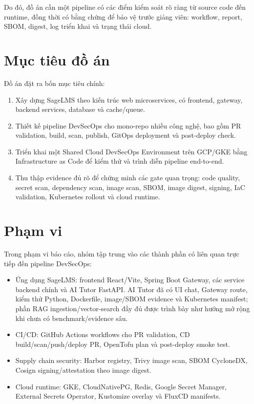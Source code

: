 Do đó, đồ án cần một pipeline có các điểm kiểm soát rõ ràng từ source code đến runtime, đồng thời có bằng chứng để bảo vệ trước giảng viên: workflow, report, SBOM, digest, log triển khai và trạng thái cloud.

\section{Mục tiêu đồ án}

Đồ án đặt ra bốn mục tiêu chính:

\begin{enumerate}
  \item Xây dựng SageLMS theo kiến trúc web microservices, có frontend, gateway, backend services, database và cache/queue.
  \item Thiết kế pipeline DevSecOps cho mono-repo nhiều công nghệ, bao gồm PR validation, build, scan, publish, GitOps deployment và post-deploy check.
  \item Triển khai một Shared Cloud DevSecOps Environment trên GCP/GKE bằng Infrastructure as Code để kiểm thử và trình diễn pipeline end-to-end.
  \item Thu thập evidence đủ rõ để chứng minh các gate quan trọng: code quality, secret scan, dependency scan, image scan, SBOM, image digest, signing, IaC validation, Kubernetes rollout và cloud runtime.
\end{enumerate}

\section{Phạm vi}

Trong phạm vi báo cáo, nhóm tập trung vào các thành phần có liên quan trực tiếp đến pipeline DevSecOps:

\begin{itemize}
  \item Ứng dụng SageLMS: frontend React/Vite, Spring Boot Gateway, các service backend chính và AI Tutor FastAPI. AI Tutor đã có UI chat, Gateway route, kiểm thử Python, Dockerfile, image/SBOM evidence và Kubernetes manifest; phần RAG ingestion/vector-search đầy đủ được trình bày như hướng mở rộng khi chưa có benchmark/evidence sâu.
  \item CI/CD: GitHub Actions workflows cho PR validation, CD build/scan/push/deploy PR, OpenTofu plan và post-deploy smoke test.
  \item Supply chain security: Harbor registry, Trivy image scan, SBOM CycloneDX, Cosign signing/attestation theo image digest.
  \item Cloud runtime: GKE, CloudNativePG, Redis, Google Secret Manager, External Secrets Operator, Kustomize overlay và FluxCD manifests.
\end{itemize}


